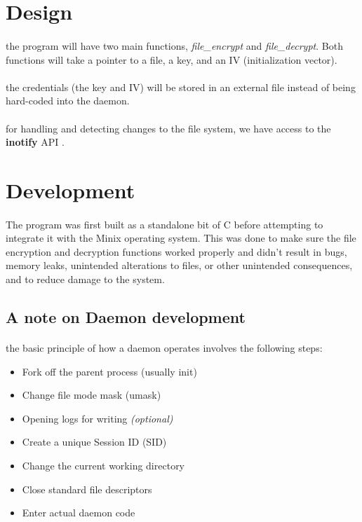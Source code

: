 \documentclass{article}
\begin{document}
\section{Design}
    \paragraph{}the program will have two main functions, \textit{file\_encrypt} and \textit{file\_decrypt}. Both functions will take a pointer to a file, a key, and an IV (initialization vector).
    \paragraph{}the credentials (the key and IV) will be stored in an external file instead of being hard-coded into the daemon.
    \paragraph{}for handling and detecting changes to the file system, we have access to the \textbf{inotify} API \parencite{inotify_manpage}.
    

\section{Development}
    \paragraph{}The program was first built as a standalone bit of C before attempting to integrate it with the Minix operating system. This was done to make sure the file encryption and decryption functions worked properly and didn't result in bugs, memory leaks, unintended alterations to files, or other unintended consequences, and to reduce damage to the system.


    \subsection{A note on Daemon development}
        \paragraph{}the basic principle of how a daemon operates involves the following steps:
        \begin{itemize}
            \item Fork off the parent process (usually init)
            \item Change file mode mask (umask)
            \item Opening logs for writing \textit{(optional)}
            \item Create a unique Session ID (SID)
            \item Change the current working directory
            \item Close standard file descriptors
            \item Enter actual daemon code
        \end{itemize}
\end{document}
